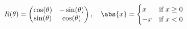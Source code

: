 \begin{frame}

	\begin{align*}
		R(\theta) = \begin{pmatrix}
			\cos(\theta) & -\sin(\theta)\\
			\sin(\theta) & \cos(\theta)
		\end{pmatrix},\quad
		\abs{x} = \begin{cases}
			x & \mbox{if $ x \geq 0$}\\
			-x & \mbox{if $ x < 0$}
		\end{cases}
	\end{align*}
\end{frame}




